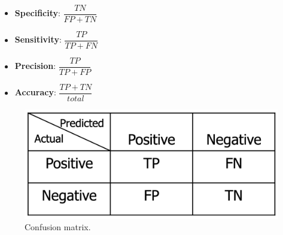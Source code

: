 \begin{itemize}
    \item \textbf{Specificity}: $\dfrac{TN}{FP + TN}$

    \item \textbf{Sensitivity}: $\dfrac{TP}{TP + FN}$

    \item \textbf{Precision}: $\dfrac{TP}{TP + FP}$

    \item \textbf{Accuracy}: $\dfrac{TP + TN}{total}$
\end{itemize}

\begin{figure}[h]
    \centering
    \includegraphics[width=0.5\linewidth]{img/Screenshot 2023-10-04 alle 21.11.26.png}
    \caption{Confusion matrix.}
\end{figure}

